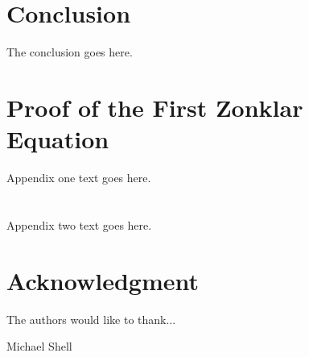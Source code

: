 \documentclass[journal]{IEEEtran}
\begin{document}
\section{Conclusion}
The conclusion goes here.






\appendices
\section{Proof of the First Zonklar Equation}
Appendix one text goes here.

\section{}
Appendix two text goes here.


\section*{Acknowledgment}


The authors would like to thank...




\begin{IEEEbiography}{Michael Shell}
\end{IEEEbiography}
\end{document}
